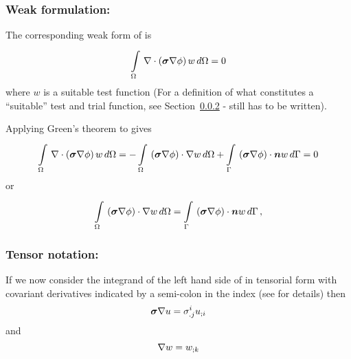 \subsubsection{Weak formulation:}

The corresponding weak form of  is
\begin{equation}
    \displaystyle\int\limits_{\Omega}^{} \, \nabla\cdot\left( \boldsymbol{\sigma}\nabla \phi \right) w\,d\Omega =0 
  \label{eqn:Laplaceweakform}
\end{equation}
where $w$ is a suitable test function (For a definition of what constitutes a
``suitable'' test and trial function, see Section~\ref{} - still has to be written).

Applying Green's theorem to  gives
\begin{equation}
 \gint{\Omega}{}{\diverg{\pbrac{\tensor{\sigma}\gradient{\phi}}}w}{\Omega}
 = -\gint{\Omega}{}{\dotprod{\pbrac{\tensor{\sigma}\gradient{\phi}}}{\gradient{w}}}{\Omega}
   +\gint{\Gamma}{}{\dotprod{\pbrac{\tensor{\sigma}\gradient{\phi}}}{\vect{n}}w}{\Gamma}
 = 0
\end{equation}
or
\begin{equation}
  \gint{\Omega}{}{\dotprod{\pbrac{\tensor{\sigma}\gradient{\phi}}}{\gradient{w}}}{\Omega}
  = \gint{\Gamma}{}{\dotprod{\pbrac{\tensor{\sigma}\gradient{\phi}}}{\vect{n}w}}{\Gamma} \,,
  \label{eqn:Laplaceweightedresidualform}
\end{equation}

\subsubsection{Tensor notation:}

If we now consider the integrand of the left hand side of
 in tensorial form with covariant
derivatives indicated by a semi-colon in the index
(see  for details) then
\begin{equation}
  \boldsymbol{\sigma}\nabla u = \sigma^{i}_{.j} {u}_{;i} 
  \label{eqn:Laplaceweakformfactor1}
\end{equation}
and
\begin{equation}
  \nabla w =  {w}_{;k} 
  \label{eqn:Laplaceweakformfactor2}
\end{equation}

